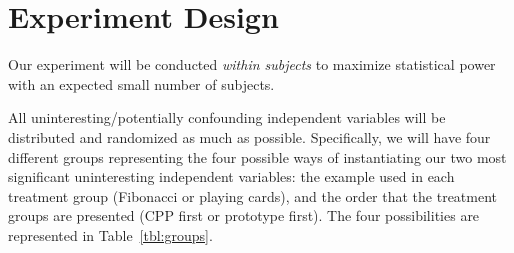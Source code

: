 \documentclass[11pt]{article}
\begin{document}
	
	\section{Experiment Design}
	\label{sec:design}
	
	Our experiment will be conducted \emph{within subjects} to maximize statistical
	power with an expected small number of subjects.
	
	All uninteresting/potentially confounding independent variables will be
	distributed and randomized as much as possible.  Specifically, we will have
	four different groups representing the four possible ways of instantiating our
	two most significant uninteresting independent variables: the example used in each
	treatment group (Fibonacci or playing cards), and the order that the treatment
	groups are presented (CPP first or prototype first).  The four possibilities
	are represented in Table~\ref{tbl:groups}.
	
\end{document}
